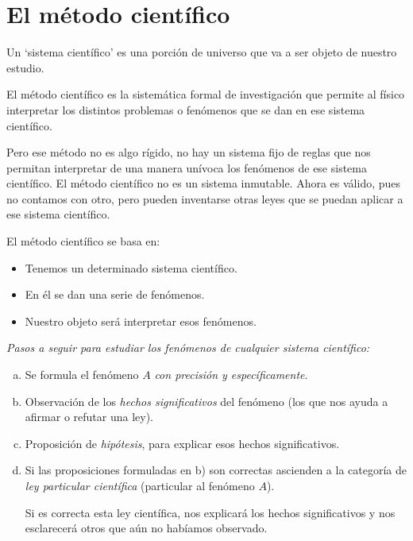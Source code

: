 \section{El método científico}

Un `sistema científico' es una porción de universo que va a ser objeto de nuestro estudio.

El método científico es la sistemática formal de investigación que permite al físico interpretar los distintos problemas o fenómenos que se dan en ese sistema científico.

Pero ese método no es algo rígido, no hay un sistema fijo de reglas que nos permitan interpretar de una manera unívoca los fenómenos de ese sistema científico. El método científico no es un sistema inmutable. Ahora es válido, pues no contamos con otro, pero pueden inventarse otras leyes que se puedan aplicar a ese sistema científico.

El método científico se basa en:

\vspace{-2mm}\begin{itemize}
\item Tenemos un determinado sistema científico.
\vspace{-2mm} \item En él se dan una serie de fenómenos.
\vspace{-2mm} \item Nuestro objeto será interpretar esos fenómenos.	
\end{itemize}


\emph{Pasos a seguir para estudiar los fenómenos de cualquier sistema científico:}

\begin{enumerate}[a) ]
	\vspace{-2mm}\item Se formula el fenómeno $A$ \emph{con precisión y específicamente}.
	\vspace{-2mm}\item Observación de los \emph{hechos significativos} del fenómeno (los que nos ayuda a afirmar o refutar una ley).
	\vspace{-2mm}\item Proposición de \emph{hipótesis}, para explicar esos hechos significativos.
	\vspace{-2mm}\item Si las proposiciones formuladas en b) son correctas ascienden a la categoría de \emph{ley particular científica} (particular al fenómeno $A$).
	
	Si es correcta esta ley científica, nos explicará los hechos significativos y nos esclarecerá otros que aún no habíamos observado.
\end{enumerate}


